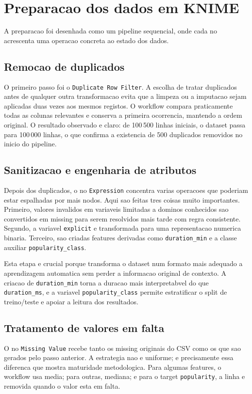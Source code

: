 \documentclass[11pt,a4paper]{article}
\begin{document}
\section{Preparacao dos dados em KNIME}
A preparacao foi desenhada como um pipeline sequencial, onde cada no acrescenta uma operacao concreta ao estado dos dados.

\subsection{Remocao de duplicados}
O primeiro passo foi o \texttt{Duplicate Row Filter}. A escolha de tratar duplicados antes de qualquer outra transformacao evita que a limpeza ou a imputacao sejam aplicadas duas vezes aos mesmos registos. O workflow compara praticamente todas as colunas relevantes e conserva a primeira ocorrencia, mantendo a ordem original. O resultado observado e claro: de 100\,500 linhas iniciais, o dataset passa para 100\,000 linhas, o que confirma a existencia de 500 duplicados removidos no inicio do pipeline.

\subsection{Sanitizacao e engenharia de atributos}
Depois dos duplicados, o no \texttt{Expression} concentra varias operacoes que poderiam estar espalhadas por mais nodos. Aqui sao feitas tres coisas muito importantes. Primeiro, valores invalidos em variaveis limitadas a dominos conhecidos sao convertidos em missing para serem resolvidos mais tarde com regra consistente. Segundo, a variavel \texttt{explicit} e transformada para uma representacao numerica binaria. Terceiro, sao criadas features derivadas como \texttt{duration\_min} e a classe auxiliar \texttt{popularity\_class}.

Esta etapa e crucial porque transforma o dataset num formato mais adequado a aprendizagem automatica sem perder a informacao original de contexto. A criacao de \texttt{duration\_min} torna a duracao mais interpretabvel do que \texttt{duration\_ms}, e a variavel \texttt{popularity\_class} permite estratificar o split de treino/teste e apoiar a leitura dos resultados.

\subsection{Tratamento de valores em falta}
O no \texttt{Missing Value} recebe tanto os missing originais do CSV como os que sao gerados pelo passo anterior. A estrategia nao e uniforme; e precisamente essa diferenca que mostra maturidade metodologica. Para algumas features, o workflow usa media; para outras, mediana; e para o target \texttt{popularity}, a linha e removida quando o valor esta em falta.
\end{document}
